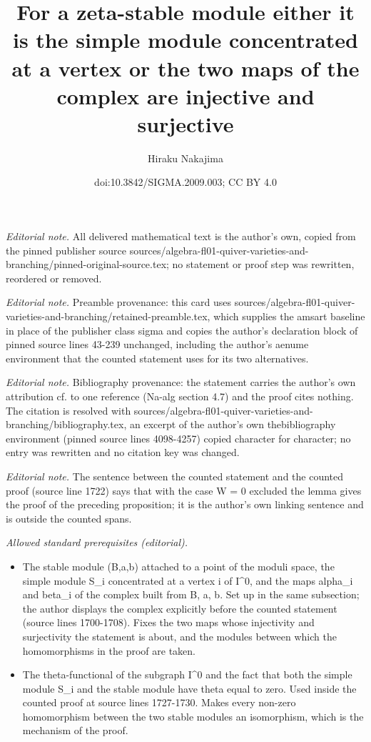 \documentclass[10pt,a4paper]{amsart}
\title{For a zeta-stable module either it is the simple module concentrated at a vertex or the two maps of the complex are injective and surjective}
\author{Hiraku Nakajima}
\date{doi:10.3842/SIGMA.2009.003; CC BY 4.0}
\theoremstyle{definition}
\numberwithin{equation}{section}
\begin{document}
\maketitle
\noindent\textit{Editorial note.} All delivered mathematical text is the author's own, copied from the pinned publisher source sources/algebra-fl01-quiver-varieties-and-branching/pinned-original-source.tex; no statement or proof step was rewritten, reordered or removed.\par\medskip
\noindent\textit{Editorial note.} Preamble provenance: this card uses sources/algebra-fl01-quiver-varieties-and-branching/retained-preamble.tex, which supplies the amsart baseline in place of the publisher class sigma and copies the author's declaration block of pinned source lines 43-239 unchanged, including the author's aenume environment that the counted statement uses for its two alternatives.\par\medskip
\noindent\textit{Editorial note.} Bibliography provenance: the statement carries the author's own attribution cf. to one reference (Na-alg section 4.7) and the proof cites nothing. The citation is resolved with sources/algebra-fl01-quiver-varieties-and-branching/bibliography.tex, an excerpt of the author's own thebibliography environment (pinned source lines 4098-4257) copied character for character; no entry was rewritten and no citation key was changed.\par\medskip
\noindent\textit{Editorial note.} The sentence between the counted statement and the counted proof (source line 1722) says that with the case W = 0 excluded the lemma gives the proof of the preceding proposition; it is the author's own linking sentence and is outside the counted spans.\par\medskip
\noindent\textit{Allowed standard prerequisites (editorial).}\begin{itemize}
\item The stable module (B,a,b) attached to a point of the moduli space, the simple module S\_i concentrated at a vertex i of I\textasciicircum{}0, and the maps alpha\_i and beta\_i of the complex built from B, a, b. Set up in the same subsection; the author displays the complex explicitly before the counted statement (source lines 1700-1708). Fixes the two maps whose injectivity and surjectivity the statement is about, and the modules between which the homomorphisms in the proof are taken.
\item The theta-functional of the subgraph I\textasciicircum{}0 and the fact that both the simple module S\_i and the stable module have theta equal to zero. Used inside the counted proof at source lines 1727-1730. Makes every non-zero homomorphism between the two stable modules an isomorphism, which is the mechanism of the proof.
\end{itemize}\medskip
\end{document}

